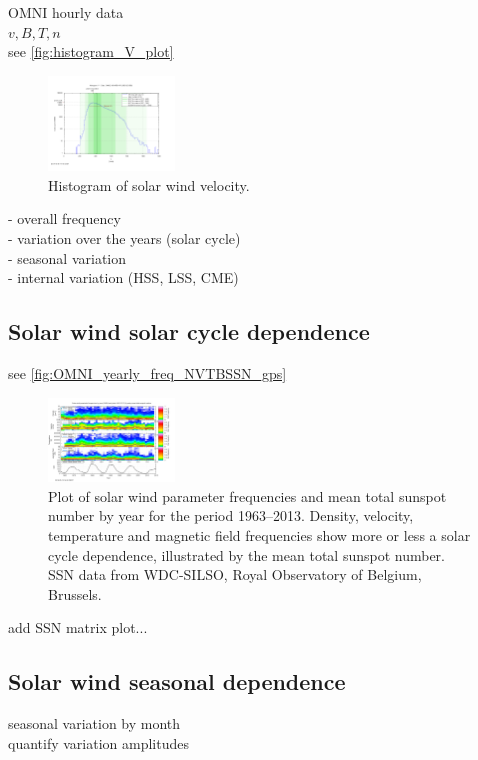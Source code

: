 OMNI hourly data\\
$v, B, T, n$\\
see \autoref{fig:histogram_V_plot}
\begin{figure}[htb]
	\centering
	\includegraphics[width=0.3\textwidth]{images/gnuplots/histogram_V_plot.png}
	\caption{Histogram of solar wind velocity.}
	\label{fig:histogram_V_plot}
\end{figure}

- overall frequency\\
- variation over the years (solar cycle)\\
- seasonal variation\\
- internal variation (HSS, LSS, CME)\\

\subsection{Solar wind solar cycle dependence}
see \autoref{fig:OMNI_yearly_freq_NVTBSSN_gps}
\begin{figure}[htb]
	\centering
	\includegraphics[width=0.3\textwidth]{images/gnuplots/OMNI_yearly_freq_NVTBSSN_gps.png}
	\caption{Plot of solar wind parameter frequencies and mean total sunspot number by year for the period 1963--2013. Density, velocity, temperature and magnetic field frequencies show more or less a solar cycle dependence, illustrated by the mean total sunspot number. SSN data from WDC-SILSO, Royal Observatory of Belgium, Brussels.}
	\label{fig:OMNI_yearly_freq_NVTBSSN_gps}
\end{figure}
add SSN matrix plot...\\

\subsection{Solar wind seasonal dependence}
seasonal variation by month\\
quantify variation amplitudes\\

